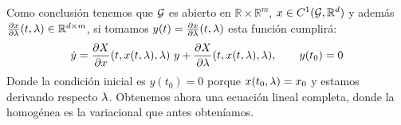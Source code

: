 \documentclass[12pt]{book}
\begin{document}
\begin{teo}
\noindent
Como conclusión tenemos que $\mathcal{G}$ es abierto en $\mathbb{R}\times\mathbb{R}^m$, $x\in C^1(\mathcal{G},\mathbb{R}^d)$ y además $\frac{\partial x}{\partial \lambda}(t,\lambda)\in \mathbb{R}^{d\times m}$, si tomamos $y(t) = \frac{\partial x}{\partial \lambda}(t,\lambda)$ esta función cumplirá:
\begin{equation*}
    \dot{y} = \frac{\partial X}{\partial x}(t,x(t,\lambda),\lambda)\ y + \frac{\partial X}{\partial \lambda}(t,x(t,\lambda),\lambda), \qquad y(t_0) = 0
\end{equation*}
Donde la condición inicial es $y(t_0) = 0$ porque $x(t_0,\lambda) = x_0$ y estamos derivando respecto $\lambda$. Obtenemos ahora una ecuación lineal completa, donde la homogénea es la variacional que antes obteníamos.\\

\end{teo}
\end{document}
